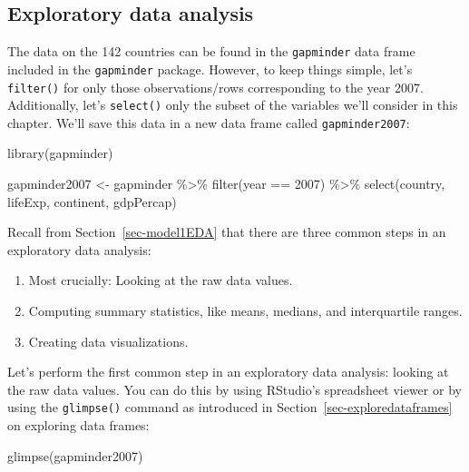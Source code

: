 \documentclass[
  letterpaper,
  DIV=11,
  numbers=noendperiod]{scrreprt}
\newenvironment{Shaded}{\begin{snugshade}}{\end{snugshade}}
\newcommand{\DecValTok}[1]{\textcolor[rgb]{0.68,0.00,0.00}{#1}}
\newcommand{\FunctionTok}[1]{\textcolor[rgb]{0.28,0.35,0.67}{#1}}
\newcommand{\NormalTok}[1]{\textcolor[rgb]{0.00,0.23,0.31}{#1}}
\newcommand{\OtherTok}[1]{\textcolor[rgb]{0.00,0.23,0.31}{#1}}
\newcommand{\SpecialCharTok}[1]{\textcolor[rgb]{0.37,0.37,0.37}{#1}}
\theoremstyle{definition}
\theoremstyle{remark}
\begin{document}
\hypertarget{sec-model2EDA}{%
\subsection{Exploratory data analysis}\label{sec-model2EDA}}

The data on the 142 countries can be found in the \texttt{gapminder}
data frame included in the \texttt{gapminder} package. However, to keep
things simple, let's \texttt{filter()} for only those observations/rows
corresponding to the year 2007. Additionally, let's \texttt{select()}
only the subset of the variables we'll consider in this chapter. We'll
save this data in a new data frame called \texttt{gapminder2007}:

\begin{Shaded}
\begin{Highlighting}[]
\FunctionTok{library}\NormalTok{(gapminder)}

\NormalTok{gapminder2007 }\OtherTok{\textless{}{-}}\NormalTok{ gapminder }\SpecialCharTok{\%\textgreater{}\%}
  \FunctionTok{filter}\NormalTok{(year }\SpecialCharTok{==} \DecValTok{2007}\NormalTok{) }\SpecialCharTok{\%\textgreater{}\%}
  \FunctionTok{select}\NormalTok{(country, lifeExp, continent, gdpPercap)}
\end{Highlighting}
\end{Shaded}

Recall from Section~\ref{sec-model1EDA} that there are three common
steps in an exploratory data analysis:

\begin{enumerate}
\def\labelenumi{\arabic{enumi}.}
\item
  Most crucially: Looking at the raw data values.
\item
  Computing summary statistics, like means, medians, and interquartile
  ranges.
\item
  Creating data visualizations.
\end{enumerate}

Let's perform the first common step in an exploratory data analysis:
looking at the raw data values. You can do this by using RStudio's
spreadsheet viewer or by using the \texttt{glimpse()} command as
introduced in Section~\ref{sec-exploredataframes} on exploring data
frames:

\begin{Shaded}
\begin{Highlighting}[]
\FunctionTok{glimpse}\NormalTok{(gapminder2007)}
\end{Highlighting}
\end{Shaded}
\end{document}
